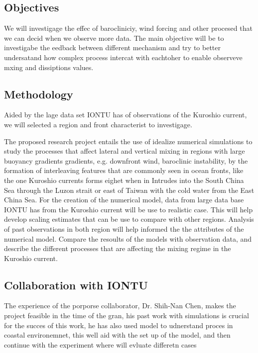 \documentclass[letterpaper, 12pt ]{article}
\begin{document}
\subsection*{Objectives}

We will investigage the effec of barocliniciy, wind forcing and other procesed that we can decid when we observe more data. The main objective will be to investigabe the eedback between different mechanism and try to better undersatand how complex process intercat with eachtoher to enable observeve mxing and dissiptions values. 


\subsection*{Methodology}
Aided by the lage data set IONTU has of observations of the Kuroshio current, we will selected a region and front characterist to investigage. 

The proposed research project entails the use of idealize numerical simulations to study the processes that affect lateral and vertical mixing in regions with large buoyancy gradients  gradients, e.g. downfront wind, baroclinic  instability,  by the formation of interleaving features that are commonly seen in ocean fronts, like the one Kuroshio currents forms eighet when in Intrudes into the South China Sea through the Luzon strait or east of Taiwan with the cold water from the East China Sea.
For the creation of the numerical model, data from large data base IONTU has from the Kuroshio current will be use to realistic case. This will help develop scaling estimates that can be use to compare with other regions. 
Analysis of past observations in both region will help informed the the attributes of the numerical model. 
Compare the resoults of the models with observation data, and describe the different processes that are affecting the mixing regime in the Kuroshio current. 


\subsection*{Collaboration with IONTU}

The experience of the  porporse collaborator, Dr. Shih-Nan Chen,  makes the project feasible in the time of the gran,  his past work with simulations is crucial for the succes of this work, he has also used model to udnerstand proces in coastal environemnet,  this well aid with the set up of the model, and then continue with the experiment where will evluate differetn cases
\end{document}
